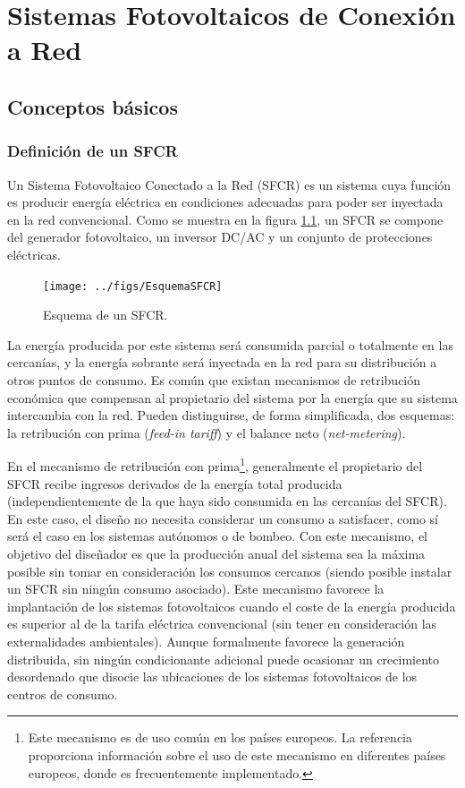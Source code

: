 
\chapter{Sistemas Fotovoltaicos de Conexión a Red}
\label{cha:SFCR}


\section{Conceptos básicos}

\subsection{Definición de un SFCR}

Un Sistema Fotovoltaico Conectado a la Red (SFCR) es un sistema cuya
función es producir energía eléctrica en condiciones adecuadas para
poder ser inyectada en la red convencional. Como se muestra en la
figura \ref{fig:EsquemaSFCR}, un SFCR se compone del generador
fotovoltaico, un inversor DC/AC y un conjunto de protecciones
eléctricas. 

%
\begin{figure}
\texttt{[image: ../figs/EsquemaSFCR]}

\caption{Esquema de un SFCR.\label{fig:EsquemaSFCR}}

\end{figure}

La energía producida por este sistema será consumida parcial o
totalmente en las cercanías, y la energía sobrante será inyectada en
la red para su distribución a otros puntos de consumo. Es común que
existan mecanismos de retribución económica que compensan al
propietario del sistema por la energía que su sistema intercambia con
la red. Pueden distinguirse, de forma simplificada, dos esquemas: la
retribución con prima (\emph{feed-in tariff}) y el balance neto
(\emph{net-metering}). 

En el mecanismo de retribución con prima\footnote{Este
mecanismo es de uso común en los países europeos. La referencia
\cite{Collado2009} proporciona información sobre el uso de este
mecanismo en diferentes países europeos, donde es frecuentemente
implementado.}, generalmente el propietario
del SFCR recibe ingresos derivados de la energía total producida
(independientemente de la que haya sido consumida en las cercanías del
SFCR). En este caso, el diseño no necesita considerar un consumo a
satisfacer, como sí será el caso en los sistemas autónomos o de
bombeo. Con este mecanismo, el objetivo del diseñador es que la
producción anual del sistema sea la máxima posible sin tomar en
consideración los consumos cercanos (siendo posible instalar un SFCR
sin ningún consumo asociado). Este mecanismo favorece la implantación
de los sistemas fotovoltaicos cuando el coste de la energía producida
es superior al de la tarifa eléctrica convencional (sin tener en
consideración las externalidades ambientales). Aunque formalmente
favorece la generación distribuida, sin ningún condicionante adicional
puede ocasionar un crecimiento desordenado que disocie las ubicaciones
de los sistemas fotovoltaicos de los centros de consumo. 

